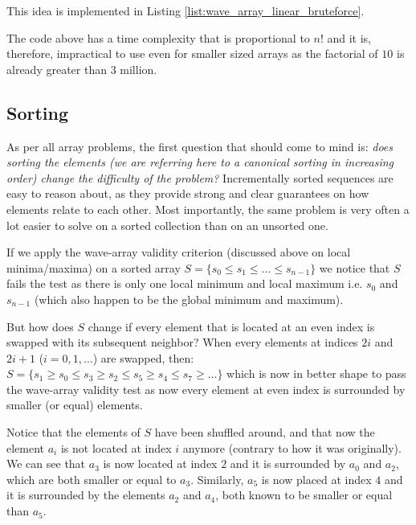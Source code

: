 This idea is implemented in Listing \ref{list:wave_array_linear_bruteforce}.



The code above has a time complexity that is proportional to $n!$ and it is, therefore, impractical to use even for smaller sized arrays as the factorial of $10$ is already greater than $3$ million. 

\subsection{Sorting}
\label{wave_array:sec:sorting}
As per all array problems, the first question that should come to mind is: \textit{does sorting the elements (we are referring here to a canonical sorting in increasing order) change the difficulty of the problem?}
Incrementally sorted sequences are easy to reason about, as they provide strong and clear guarantees on how elements relate to each other. Most importantly, the same problem is very often a lot easier to solve on a sorted collection than on an unsorted one.
 
If we apply the wave-array validity criterion (discussed above on local minima/maxima) on a sorted array $S=\{s_0 \leq s_1 \leq \ldots \leq s_{n-1}\}$ we notice that $S$ fails the test as there is only one local minimum and local maximum i.e. $s_0$ and $s_{n-1}$ (which also happen to be the global minimum and maximum).

But how does $S$ change if every element that is located at an even index is swapped with its subsequent neighbor?
When every elements at indices $2i$ and $2i+1$ ($i=0,1,\ldots$) are swapped, then:
$S=\{s_1 \geq s_0 \leq s_3 \geq s_2 \leq s_5 \geq s_4 \leq s_7  \geq \ldots\}$ which is now in better shape to pass the wave-array validity test as now every element at even index is surrounded by smaller (or equal) elements. 

Notice that the elements of $S$ have been shuffled around, and that now the element $a_i$ is not located at index $i$ anymore (contrary to how it was originally).
We can see that $a_3$ is now located at index $2$ and it is surrounded by $a_0$ and $a_2$, which are both smaller or equal to $a_3$.
Similarly, $a_5$ is now placed at index $4$ and it is surrounded by the elements $a_2$ and $a_4$, both known to be smaller or equal than $a_5$.

